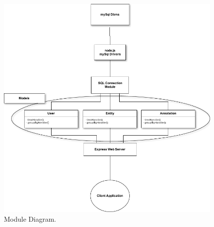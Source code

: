 \documentclass[a4paper,13pt]{report}
\begin{document}
\begin{figure}[ht]
  \caption{Module Diagram.}
  \centering
    \includegraphics[height=1\textwidth]{pics/moduleChart}
\end{figure}
\end{document}
